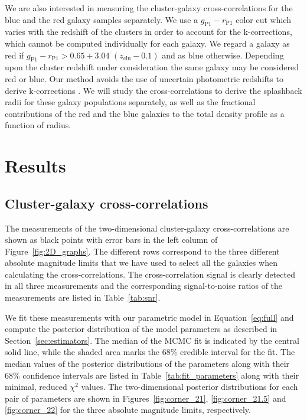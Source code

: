 \documentclass[iop, apjl, twocolappendix, numberedappendix]{emulateapj}
\begin{document}
We are also interested in measuring the cluster-galaxy
cross-correlations for the blue and the red galaxy samples
separately. We use a $g_{\mathrm{P1}}-r_{\mathrm{P1}}$ color cut
which varies with the redshift of the clusters in order to account
for the k-corrections, which cannot be computed individually for
each galaxy. We regard a galaxy as red if
$g_{\mathrm{P1}}-r_{\mathrm{P1}} > 0.65 + 3.04$ $(z_{\mathrm{clu}} -
0.1)$ and as blue otherwise. Depending upon the cluster redshift
under consideration the same galaxy may be considered red or blue. Our
method avoids the use of uncertain photometric redshifts to derive
k-corrections \citep[cf.][]{baxter2017halo}. We will study the
cross-correlations to derive the splashback radii for these galaxy
populations separately, as well as the fractional
contributions of the red and the blue galaxies to the total density profile
as a function of radius.


\section{Results}
\label{sec:Results}
\subsection{Cluster-galaxy cross-correlations}
The measurements of the two-dimensional cluster-galaxy
cross-correlations are shown as black points with error bars in the
left column of Figure~\ref{fig:2D_graphs}. The different rows
correspond to the three different absolute magnitude limits that we
have used to select all the galaxies when calculating the
cross-correlations. The cross-correlation signal is clearly detected
in all three measurements and the corresponding signal-to-noise
ratios of the measurements are listed in Table~\ref{tab:snr}.

We fit these measurements with our parametric model in Equation~\ref{eq:full}
and compute the posterior distribution of the model parameters 
as described in Section~\ref{sec:estimators}. The
median of the MCMC fit is indicated by the central solid line, while
the shaded area marks the 68\% credible interval for the fit. The
median values of the posterior distributions of the parameters along
with their 68\% confidence intervals are listed in
Table~\ref{tab:fit_parameters} along with their minimal, reduced
$\chi^2$ values. The two-dimensional posterior distributions for
each pair of parameters are shown in Figures~\ref{fig:corner_21},
\ref{fig:corner_21.5} and \ref{fig:corner_22} for the three absolute
magnitude limits, respectively.
\end{document}
